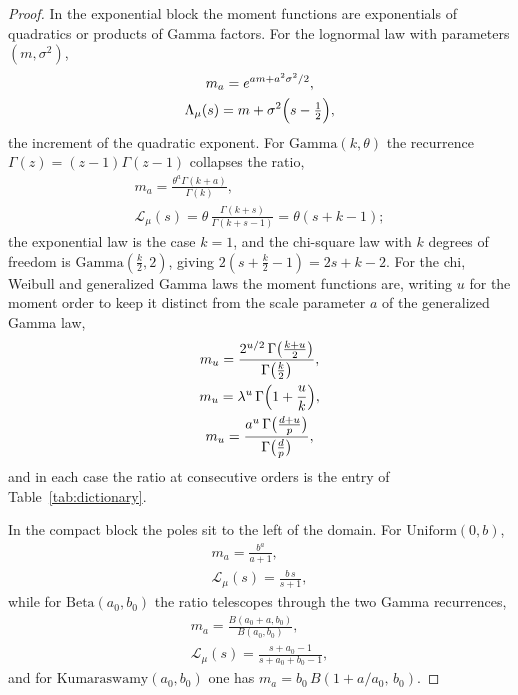 \documentclass[sn-mathphys-num]{sn-jnl}
\theoremstyle{thmstyleone}%
\theoremstyle{thmstyletwo}%
\theoremstyle{thmstylethree}%
\theoremstyle{thmstyleone}%
\providecommand{\Leh}{\mathscr{L}}
\begin{document}
\begin{appendices}
\begin{proof}
			In the exponential block the moment functions are exponentials
			of quadratics or products of Gamma factors. For the lognormal
			law with parameters $(m,\sigma^2)$,
			\begin{equation}\label{eq:dictLN}
				\begin{gathered}
					m_a=e^{am+a^2\sigma^2/2},\\
					\Lambda_\mu(s)=m+\sigma^2\Bigl(s-\tfrac12\Bigr),
				\end{gathered}
			\end{equation}
			the increment of the quadratic exponent. For
			$\mathrm{Gamma}(k,\theta)$ the recurrence
			$\Gamma(z)=(z-1)\Gamma(z-1)$ collapses the ratio,
			\begin{equation}\label{eq:dictGamma}
				\begin{gathered}
					m_a=\frac{\theta^a\Gamma(k+a)}{\Gamma(k)},\\
					\Leh_\mu(s)=\theta\,\frac{\Gamma(k+s)}{\Gamma(k+s-1)}
					=\theta(s+k-1);
				\end{gathered}
			\end{equation}
			the exponential law is the case $k=1$, and the chi-square law
			with $k$ degrees of freedom is $\mathrm{Gamma}(\tfrac k2,2)$,
			giving $2(s+\tfrac k2-1)=2s+k-2$. For the chi, Weibull and
			generalized Gamma laws the moment functions are, writing $u$ for
			the moment order to keep it distinct from the scale parameter
			$a$ of the generalized Gamma law,
			\begin{equation}\label{eq:dictChi}
				\begin{gathered}
					m_u=\frac{2^{u/2}\,\Gamma\bigl(\tfrac{k+u}2\bigr)}
					{\Gamma\bigl(\tfrac k2\bigr)},\\
					m_u=\lambda^u\,\Gamma\Bigl(1+\frac uk\Bigr),\\
					m_u=\frac{a^{u}\,\Gamma\bigl(\tfrac{d+u}p\bigr)}
					{\Gamma\bigl(\tfrac dp\bigr)} ,
				\end{gathered}
			\end{equation}
			and in each case the ratio at consecutive orders is the entry of
			Table~\ref{tab:dictionary}.
			
			In the compact block the poles sit to the left of the domain.
			For $\mathrm{Uniform}(0,b)$,
			\begin{equation}\label{eq:dictUnif}
				\begin{gathered}
					m_a=\frac{b^a}{a+1},\\
					\Leh_\mu(s)=\frac{b\,s}{s+1} ,
				\end{gathered}
			\end{equation}
			while for $\mathrm{Beta}(a_0,b_0)$ the ratio telescopes through
			the two Gamma recurrences,
			\begin{equation}\label{eq:dictBeta}
				\begin{gathered}
					m_a=\frac{B(a_0+a,b_0)}{B(a_0,b_0)},\\
					\Leh_\mu(s)=\frac{s+a_0-1}{s+a_0+b_0-1} ,
				\end{gathered}
			\end{equation}
			and for $\mathrm{Kumaraswamy}(a_0,b_0)$ one has
			$m_a=b_0\,B(1+a/a_0,\,b_0)$.
			

\end{proof}
\end{appendices}
\end{document}
